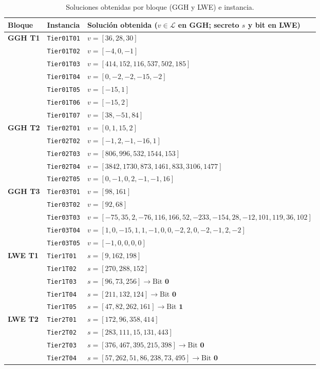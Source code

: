 \documentclass[12pt,a4paper]{article}
\begin{document}
\begin{table}[h!]
\centering
\scriptsize
\begin{tabularx}{\textwidth}{l l X}
\toprule
\textbf{Bloque} & \textbf{Instancia} & \textbf{Solución obtenida ($v \in \mathcal{L}$ en GGH; secreto $s$ y bit en LWE)} \\
\midrule
\textbf{GGH T1} & \texttt{Tier01T01} & $v = [36, 28, 30]$ \\
 & \texttt{Tier01T02} & $v = [-4, 0, -1]$ \\
 & \texttt{Tier01T03} & $v = [414, 152, 116, 537, 502, 185]$ \\
 & \texttt{Tier01T04} & $v = [0, -2, -2, -15, -2]$ \\
 & \texttt{Tier01T05} & $v = [-15, 1]$ \\
 & \texttt{Tier01T06} & $v = [-15, 2]$ \\
 & \texttt{Tier01T07} & $v = [38, -51, 84]$ \\
\midrule
\textbf{GGH T2} & \texttt{Tier02T01} & $v = [0, 1, 15, 2]$ \\
 & \texttt{Tier02T02} & $v = [-1, 2, -1, -16, 1]$ \\
 & \texttt{Tier02T03} & $v = [806, 996, 532, 1544, 153]$ \\
 & \texttt{Tier02T04} & $v = [3842, 1730, 873, 1461, 833, 3106, 1477]$ \\
 & \texttt{Tier02T05} & $v = [0, -1, 0, 2, -1, -1, 16]$ \\
\midrule
\textbf{GGH T3} & \texttt{Tier03T01} & $v = [98, 161]$ \\
 & \texttt{Tier03T02} & $v = [92, 68]$ \\
 & \texttt{Tier03T03} & $v = [-75, 35, 2, -76, 116, 166, 52, -233, -154, 28, -12, 101, 119, 36, 102]$ \\
 & \texttt{Tier03T04} & $v = [1, 0, -15, 1, 1, -1, 0, 0, -2, 2, 0, -2, -1, 2, -2]$ \\
 & \texttt{Tier03T05} & $v = [-1, 0, 0, 0, 0]$ \\
\midrule
\textbf{LWE T1} & \texttt{Tier1T01} & $s = [9, 162, 198]$ \\
 & \texttt{Tier1T02} & $s = [270, 288, 152]$ \\
 & \texttt{Tier1T03} & $s = [96, 73, 256] \rightarrow \text{Bit } \mathbf{0}$ \\
 & \texttt{Tier1T04} & $s = [211, 132, 124] \rightarrow \text{Bit } \mathbf{0}$ \\
 & \texttt{Tier1T05} & $s = [47, 82, 262, 161] \rightarrow \text{Bit } \mathbf{1}$ \\
\midrule
\textbf{LWE T2} & \texttt{Tier2T01} & $s = [172, 96, 358, 414]$ \\
 & \texttt{Tier2T02} & $s = [283, 111, 15, 131, 443]$ \\
 & \texttt{Tier2T03} & $s = [376, 467, 395, 215, 398] \rightarrow \text{Bit } \mathbf{0}$ \\
 & \texttt{Tier2T04} & $s = [57, 262, 51, 86, 238, 73, 495] \rightarrow \text{Bit } \mathbf{0}$ \\
\bottomrule
\end{tabularx}
\caption{Soluciones  obtenidas por bloque (GGH y LWE) e instancia.}
\end{table}
\end{document}
